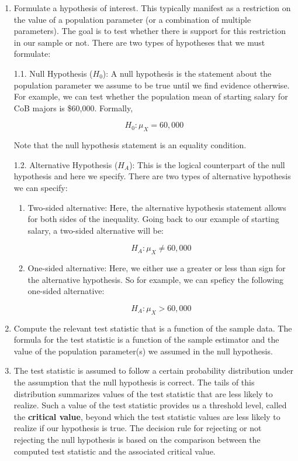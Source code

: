 \documentclass[]{book}
\theoremstyle{definition}
\theoremstyle{definition}
\theoremstyle{definition}
\theoremstyle{remark}
\begin{document}
\begin{enumerate}
\def\labelenumi{\arabic{enumi}.}
\item
  Formulate a hypothesis of interest. This typically manifest as a restriction on the value of a population parameter (or a combination of multiple parameters). The goal is to test whether there is support for this restriction in our sample or not. There are two types of hypotheses that we must formulate:

  1.1. Null Hypothesis (\(H_0\)): A null hypothesis is the statement about the population parameter we assume to be true until we find evidence otherwise. For example, we can test whether the population mean of starting salary for CoB majors is \$60,000. Formally,

  \[H_0: \mu_X = 60,000\]

  Note that the null hypothesis statement is an equality condition.

  1.2. Alternative Hypothesis (\(H_A\)): This is the logical counterpart of the null hypothesis and here we specify. There are two types of alternative hypothesis we can specify:

  \begin{enumerate}
  \def\labelenumii{\alph{enumii}.}
  \item
    Two-sided alternative: Here, the alternative hypothesis statement allows for both sides of the inequality. Going back to our example of starting salary, a two-sided alternative will be:

    \[H_A: \mu_X \neq 60,000\]
  \item
    One-sided alternative: Here, we either use a greater or less than sign for the alternative hypothesis. So for example, we can speficy the following one-sided alternative:

    \[H_A: \mu_X > 60,000\]
  \end{enumerate}
\item
  Compute the relevant test statistic that is a function of the sample data. The formula for the test statistic is a function of the sample estimator and the value of the population parameter(s) we assumed in the null hypothesis.
\item
  The test statistic is assumed to follow a certain probability distribution under the assumption that the null hypothesis is correct. The tails of this distribution summarizes values of the test statistic that are less likely to realize. Such a value of the test statistic provides us a threshold level, called the \textbf{critical value}, beyond which the test statistic values are less likely to realize if our hypothesis is true. The decision rule for rejecting or not rejecting the null hypothesis is based on the comparison between the computed test statistic and the associated critical value.
\end{enumerate}
\end{document}
